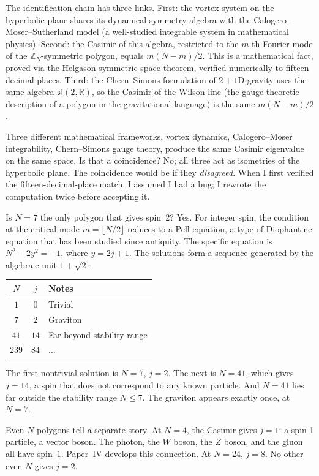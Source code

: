 The identification chain has three links. First: the vortex system on
the hyperbolic plane shares its dynamical symmetry algebra with the
Calogero--Moser--Sutherland model (a well-studied integrable system in
mathematical physics). Second: the Casimir of this algebra, restricted to
the $m$-th Fourier mode of the $\mathbb{Z}_N$-symmetric polygon, equals
$m(N-m)/2$. This is a mathematical fact, proved via the Helgason
symmetric-space theorem, verified numerically to fifteen decimal places.
Third: the Chern--Simons formulation of $2{+}1$D gravity uses the same
algebra $\mathfrak{sl}(2, \mathbb{R})$, so the Casimir of the Wilson
line (the gauge-theoretic description of a polygon in the gravitational
language) is the same $m(N-m)/2$.

Three different mathematical frameworks, vortex dynamics,
Calogero--Moser integrability, Chern--Simons gauge theory, produce the
same Casimir eigenvalue on the same space. Is that a coincidence? No;
all three act as isometries of the hyperbolic plane. The coincidence
would be if they \emph{disagreed}. When I first verified the
fifteen-decimal-place match, I assumed I had a bug; I rewrote the
computation twice before accepting it.

Is $N = 7$ the only polygon that gives spin~$2$? Yes. For integer spin, the condition at the critical mode $m = \lfloor N/2 \rfloor$ reduces to a
Pell equation, a type of Diophantine equation that has been studied
since antiquity. The specific equation is $N^2 - 2y^2 = -1$, where
$y = 2j + 1$. The solutions form a sequence generated by the algebraic
unit $1 + \sqrt{2}$:
\begin{center}
\small
\begin{tabular}{ccl}
\toprule
$N$ & $j$ & Notes \\
\midrule
$1$ & $0$ & Trivial \\
$7$ & $2$ & Graviton \\
$41$ & $14$ & Far beyond stability range \\
$239$ & $84$ & $\ldots$ \\
\bottomrule
\end{tabular}
\end{center}
The first nontrivial solution is $N = 7$, $j = 2$. The next is
$N = 41$, which gives $j = 14$, a spin that does not correspond to any
known particle. And $N = 41$ lies far outside the stability range
$N \le 7$. The graviton appears exactly once, at $N = 7$.

Even-$N$ polygons tell a separate story. At $N = 4$, the Casimir gives
$j = 1$: a spin-1 particle, a vector boson. The photon, the $W$ boson,
the $Z$ boson, and the gluon all have spin~$1$. Paper~IV develops this
connection. At $N = 24$, $j = 8$. No other even $N$ gives $j = 2$.

